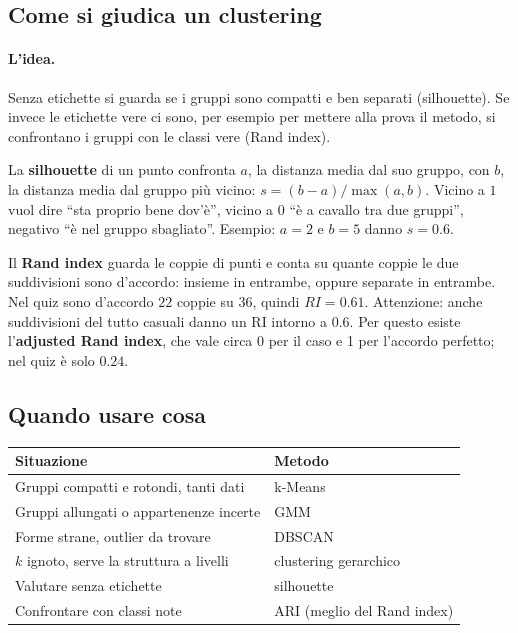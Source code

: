 \subsection{Come si giudica un clustering}
\paragraph*{L'idea.} Senza etichette si guarda se i gruppi sono compatti e ben separati (silhouette). Se invece le etichette vere ci sono, per esempio per mettere alla prova il metodo, si confrontano i gruppi con le classi vere (Rand index).

La \textbf{silhouette} di un punto confronta $a$, la distanza media dal suo gruppo, con $b$, la distanza media dal gruppo più vicino: $s = (b-a)/\max(a,b)$. Vicino a $1$ vuol dire ``sta proprio bene dov'è'', vicino a $0$ ``è a cavallo tra due gruppi'', negativo ``è nel gruppo sbagliato''. Esempio: $a = 2$ e $b = 5$ danno $s = 0.6$.

Il \textbf{Rand index} guarda le coppie di punti e conta su quante coppie le due suddivisioni sono d'accordo: insieme in entrambe, oppure separate in entrambe. Nel quiz sono d'accordo $22$ coppie su $36$, quindi $RI = 0.61$. Attenzione: anche suddivisioni del tutto casuali danno un RI intorno a $0.6$. Per questo esiste l'\textbf{adjusted Rand index}, che vale circa 0 per il caso e 1 per l'accordo perfetto; nel quiz è solo $0.24$.

\subsection{Quando usare cosa}
\begin{center}
    \begin{tabular}{l|l}
        \textbf{Situazione} & \textbf{Metodo} \\ \hline
        Gruppi compatti e rotondi, tanti dati     & k-Means \\
        Gruppi allungati o appartenenze incerte   & GMM \\
        Forme strane, outlier da trovare          & DBSCAN \\
        $k$ ignoto, serve la struttura a livelli  & clustering gerarchico \\
        Valutare senza etichette                  & silhouette \\
        Confrontare con classi note               & ARI (meglio del Rand index) \\
    \end{tabular}
\end{center}

